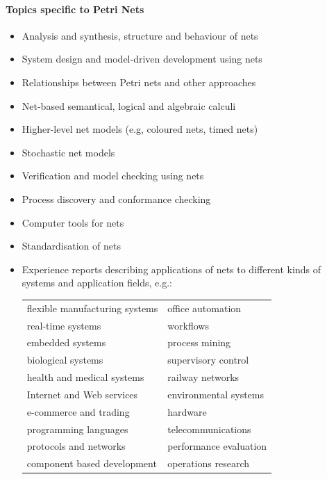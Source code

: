 \documentclass[10pt]{article}
\begin{document}
\begin{multicols}{2}

\paragraph*{Topics specific to Petri Nets}

\begin{itemize}[leftmargin=*]
\item Analysis and synthesis, structure and behaviour of nets
\item System design and model-driven development using nets
\item Relationships between Petri nets and other approaches
\item Net-based semantical, logical and algebraic calculi
\item Higher-level net models (e.g, coloured nets, timed nets)
\item Stochastic net models
\item Verification and model checking using nets
\item Process discovery and conformance checking
\item Computer tools for nets
\item Standardisation of nets

\item Experience reports describing applications of nets to different kinds of systems
and application fields, e.g.:

	\begin{tabular}{ll}
	flexible manufacturing systems & office automation \\
	real-time systems & workflows \\
	embedded systems & process mining \\
	biological systems & supervisory control \\
	health and medical systems & railway networks  \\
	Internet and Web services & environmental systems \\
	e-commerce and trading & hardware \\
	programming languages & telecommunications  \\
	protocols and networks & performance evaluation \\
	component based development & operations research \\
	\end{tabular}
\end{itemize}


\end{multicols}
\end{document}
